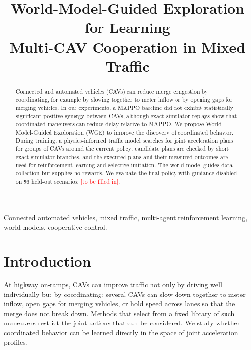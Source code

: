 \documentclass[conference]{IEEEtran}
\newcommand{\tbf}{\textcolor{red}{[to be filled in]}}
\begin{document}
\title{World-Model-Guided Exploration for Learning\\Multi-CAV Cooperation in Mixed Traffic}

\author{}

\maketitle

\begin{abstract}
Connected and automated vehicles (CAVs) can reduce merge congestion by coordinating, for example by slowing together to meter inflow or by opening gaps for merging vehicles. In our experiments, a MAPPO baseline did not exhibit statistically significant positive synergy between CAVs, although exact simulator replays show that coordinated maneuvers can reduce delay relative to MAPPO. %
We propose World-Model-Guided Exploration (WGE) to improve the discovery of coordinated behavior. During training, a physics-informed traffic model searches for joint acceleration plans for groups of CAVs around the current policy; candidate plans are checked by short exact simulator branches, and the executed plans and their measured outcomes are used for reinforcement learning and selective imitation. The world model guides data collection but supplies no rewards. We evaluate the final policy with guidance disabled on 96 held-out scenarios: \tbf.
\end{abstract}

\begin{IEEEkeywords}
Connected automated vehicles, mixed traffic, multi-agent reinforcement learning, world models, cooperative control.
\end{IEEEkeywords}

\section{Introduction}

At highway on-ramps, CAVs can improve traffic not only by driving well individually but by coordinating: several CAVs can slow down together to meter inflow, open gaps for merging vehicles, or hold speed across lanes so that the merge does not break down. Methods that select from a fixed library of such maneuvers restrict the joint actions that can be considered. We study whether coordinated behavior can be learned directly in the space of joint acceleration profiles.
\end{document}
